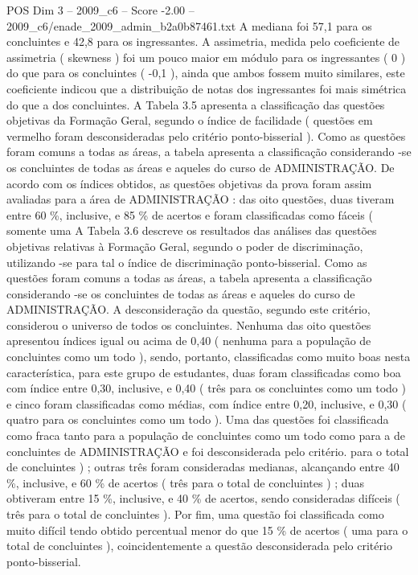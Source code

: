 \begin{textsample}{POS Dim 3 – 2009\_c6 – Score -2.00 – 2009\_c6/enade\_2009\_admin\_b2a0b87461.txt}
A mediana foi 57,1 para os concluintes e 42,8 para os ingressantes.
A assimetria, medida pelo coeficiente de assimetria ( skewness ) foi um pouco maior em módulo para os ingressantes ( 0 ) do que para os concluintes ( -0,1 ), ainda que ambos fossem muito similares, este coeficiente indicou que a distribuição de notas dos ingressantes foi mais simétrica do que a dos concluintes.
A Tabela 3.5 apresenta a classificação das questões objetivas da Formação Geral, segundo o índice de facilidade ( questões em vermelho foram desconsideradas pelo critério ponto-bisserial ).
Como as questões foram comuns a todas as áreas, a tabela apresenta a classificação considerando -se os concluintes de todas as áreas e aqueles do curso de ADMINISTRAÇÃO.
De acordo com os índices obtidos, as questões objetivas da prova foram assim avaliadas para a área de ADMINISTRAÇÃO : das oito questões, duas tiveram entre 60 \%, inclusive, e 85 \% de acertos e foram classificadas como fáceis ( somente uma A Tabela 3.6 descreve os resultados das análises das questões objetivas relativas à Formação Geral, segundo o poder de discriminação, utilizando -se para tal o índice de discriminação ponto-bisserial.
Como as questões foram comuns a todas as áreas, a tabela apresenta a classificação considerando -se os concluintes de todas as áreas e aqueles do curso de ADMINISTRAÇÃO.
A desconsideração da questão, segundo este critério, considerou o universo de todos os concluintes.
Nenhuma das oito questões apresentou índices igual ou acima de 0,40 ( nenhuma para a população de concluintes como um todo ), sendo, portanto, classificadas como muito boas nesta característica, para este grupo de estudantes, duas foram classificadas como boa com índice entre 0,30, inclusive, e 0,40 ( três para os concluintes como um todo ) e cinco foram classificadas como médias, com índice entre 0,20, inclusive, e 0,30 ( quatro para os concluintes como um todo ).
Uma das questões foi classificada como fraca tanto para a população de concluintes como um todo como para a de concluintes de ADMINISTRAÇÃO e foi desconsiderada pelo critério. para o total de concluintes ) ; outras três foram consideradas medianas, alcançando entre 40 \%, inclusive, e 60 \% de acertos ( três para o total de concluintes ) ; duas obtiveram entre 15 \%, inclusive, e 40 \% de acertos, sendo consideradas difíceis ( três para o total de concluintes ).
Por fim, uma questão foi classificada como muito difícil tendo obtido percentual menor do que 15 \% de acertos ( uma para o total de concluintes ), coincidentemente a questão desconsiderada pelo critério ponto-bisserial.

\end{textsample}

